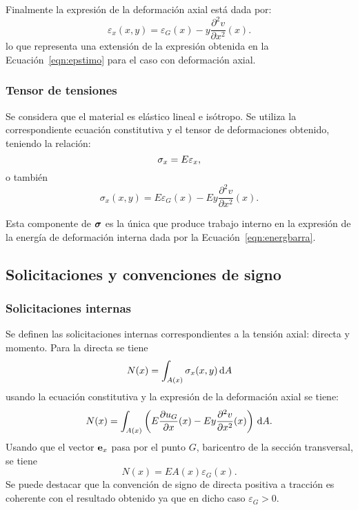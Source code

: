 Finalmente la expresión de la deformación axial está dada por:
%
\begin{equation}\label{eqn:epsdef}
\boxed{
\varepsilon_x(x,y) =  \varepsilon_G (x) -y \frac{\partial^2 v}{\partial x^2}(x).
}
\end{equation}
lo que representa una extensión de la expresión obtenida en la Ecuación~\eqref{eqn:epstimo} para el caso con deformación axial.




\subsubsection{Tensor de tensiones}

Se considera que el material es elástico lineal e isótropo. Se utiliza la correspondiente ecuación constitutiva y el tensor de deformaciones obtenido, teniendo la relación:
%
\begin{equation}
  \sigma_x = E \varepsilon_x,
\end{equation}
o también
\begin{equation}
	\sigma_x (x,y) =  E \varepsilon_G(x) - E y \frac{\partial^2 v}{\partial x^2} (x).
\end{equation}

Esta componente de $\boldsymbol{\sigma}$ es la única que produce trabajo interno en la expresión de la energía de deformación interna dada por la Ecuación~\eqref{eqn:energbarra}.

\subsection{Solicitaciones y convenciones de signo}


\subsubsection{Solicitaciones internas}

Se definen las solicitaciones internas correspondientes a la tensión axial: directa y momento. %
%
Para la directa se tiene
%
\begin{equation}
N (x) = \int_{A(x)} \sigma_x (x,y) \, {\text{d}} A
\end{equation}
%
usando la ecuación constitutiva y la expresión de la deformación axial se tiene:
%
\begin{equation}
N (x) = \int_{A(x)} \left( E \frac{\partial u_G}{\partial x}(x) - E y \frac{\partial^2 v}{\partial x^2}(x)   \right) \, {\text{d}} A.
\end{equation}
%
Usando que el vector ${\bf e}_x$ pasa por el punto $G$, baricentro de la sección transversal, se tiene
%
\begin{equation}\label{eqn:direc}
\boxed{
N (x) =  E A(x)  \varepsilon_G(x).
}
\end{equation}
%
Se puede destacar que la convención de signo de directa positiva a tracción es coherente con el resultado obtenido ya que en dicho caso $\varepsilon_G >0$.

